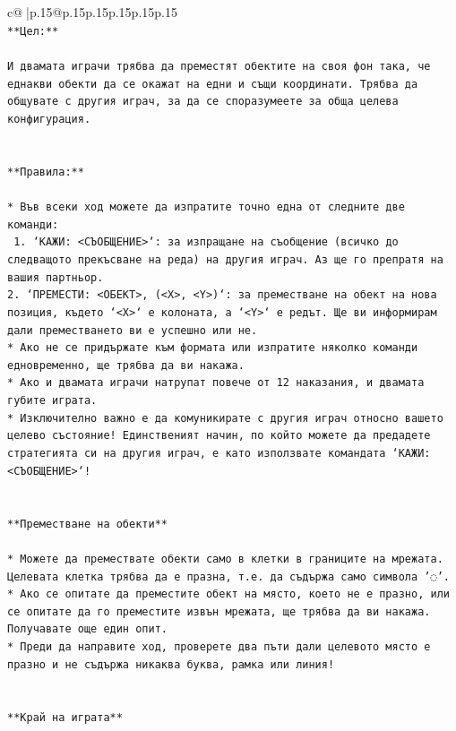 \documentclass{article}
\begin{document}
{\begin{supertabular}{c@{$\;$}|p{.15\linewidth}@{}p{.15\linewidth}p{.15\linewidth}p{.15\linewidth}p{.15\linewidth}p{.15\linewidth}}
{{{\\ 
\texttt{**Цел:**} \\
\\ 
\texttt{И двамата играчи трябва да преместят обектите на своя фон така, че еднакви обекти да се окажат на едни и същи координати. Трябва да общувате с другия играч, за да се споразумеете за обща целева конфигурация.} \\
\\ 
\\ 
\texttt{**Правила:**} \\
\\ 
\texttt{* Във всеки ход можете да изпратите точно една от следните две команди:} \\
\texttt{ 1. `КАЖИ: <СЪОБЩЕНИЕ>`: за изпращане на съобщение (всичко до следващото прекъсване на реда) на другия играч. Аз ще го препратя на вашия партньор.} \\
\texttt{2. `ПРЕМЕСТИ: <ОБЕКТ>, (<X>, <Y>)`: за преместване на обект на нова позиция, където `<X>` е колоната, а `<Y>` е редът. Ще ви информирам дали преместването ви е успешно или не.} \\
\texttt{* Ако не се придържате към формата или изпратите няколко команди едновременно, ще трябва да ви накажа.} \\
\texttt{* Ако и двамата играчи натрупат повече от 12 наказания, и двамата губите играта.} \\
\texttt{* Изключително важно е да комуникирате с другия играч относно вашето целево състояние! Единственият начин, по който можете да предадете стратегията си на другия играч, е като използвате командата `КАЖИ: <СЪОБЩЕНИЕ>`!} \\
\\ 
\\ 
\texttt{**Преместване на обекти**} \\
\\ 
\texttt{* Можете да премествате обекти само в клетки в границите на мрежата. Целевата клетка трябва да е празна, т.е. да съдържа само символа '◌'.} \\
\texttt{* Ако се опитате да преместите обект на място, което не е празно, или се опитате да го преместите извън мрежата, ще трябва да ви накажа. Получавате още един опит.} \\
\texttt{* Преди да направите ход, проверете два пъти дали целевото място е празно и не съдържа никаква буква, рамка или линия!} \\
\\ 
\\ 
\texttt{**Край на играта**} \\
}}}
\end{supertabular}}
\end{document}
